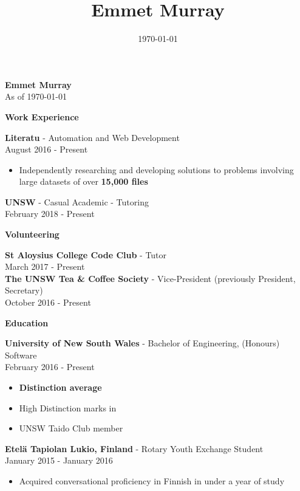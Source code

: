 \documentclass{article}
\title{\textbf{Emmet Murray}}
\date{\today}
\newcommand{\minititle}[1]{{\Large \begin{center} \textbf{#1} \end{center}} \vspace{0.2cm}}
\newcommand{\resumeEntry}[3]{{\large \textbf{#1} - #2} \\ {\small #3} }
\begin{document}
 
%
\begin{minipage}[t]{0.6\linewidth}   
    \begin{center}
        { \huge \textbf{Emmet Murray}} \\
        \vspace{0.4cm}
        As of \today
    \end{center}
    {
        \minititle{Work Experience}
        \resumeEntry{Literatu}{Automation and Web Development}{August 2016 - Present}
        \begin{itemize}
            \setlength\itemsep{0.01cm}
            \item Independently researching and developing solutions to problems involving large datasets of over \textbf{15,000 files}
        \end{itemize}
        \vspace{0.3cm}
        \resumeEntry{UNSW}{Casual Academic - Tutoring}{February 2018 - Present}
    }
    {
        \vspace{0.05cm}
        \minititle{Volunteering}
        \resumeEntry{St Aloysius College Code Club}{Tutor}{March 2017 - Present} \\
        \noindent
        \resumeEntry{The UNSW Tea \& Coffee Society}{Vice-President (previously President, Secretary)}{October 2016 - Present}
    }
    {
        \vspace{0.1cm}
        \minititle{Education}
        \resumeEntry{University of New South Wales}{Bachelor of Engineering, (Honours) Software}{February 2016 - Present}
        \begin{itemize}
            \setlength\itemsep{0.01cm}
            \item \textbf{Distinction average}
            \item High Distinction marks in 
            \item UNSW Taido Club member
        \end{itemize}
        \vspace{0.4cm}
        \resumeEntry{Etel{\"a} Tapiolan Lukio, Finland}{Rotary Youth Exchange Student}{January 2015 - January 2016}
        \begin{itemize}
            \setlength\itemsep{0.01cm}
            \item Acquired conversational proficiency in Finnish in under a year of study
        \end{itemize}
    }
\end{minipage}\hspace{1cm}
\end{document}
